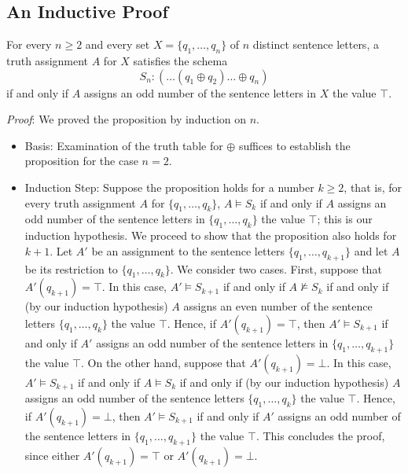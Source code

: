\subsection{An Inductive Proof}
\begin{proposition}\label{parity-prop}
For every $n\geq 2$ and every set $X=\{q_1,\ldots,q_n\}$ of $n$ distinct sentence letters, a truth assignment $A$ for $X$ satisfies the schema
\[S_n: (\ldots(q_1\oplus q_2)\ldots\oplus q_n)\]
if and only if $A$ assigns an odd number of the sentence letters in $X$ the value $\top$.
\end{proposition}
\emph{Proof}: We proved the proposition by induction on $n$. 
\begin{itemize}
\item Basis: Examination of the truth table for $\oplus$ suffices to establish the proposition for the case $n=2$.
\item Induction Step: Suppose the proposition holds for a number $k\geq 2$, that is, 
for every truth assignment $A$ for $\{q_1,\ldots,q_k\}$, $A\models S_k$ if and only if $A$ assigns an odd number of the sentence letters in $\{q_1,\ldots,q_k\}$ the value $\top$; this is our induction hypothesis.
We proceed to show that the proposition also holds for $k+1$. Let $A'$ be an assignment to the sentence letters 
$\{q_1,\ldots,q_{k+1}\}$ and let $A$ be its restriction to $\{q_1,\ldots,q_k\}$. We consider two cases. First, suppose that $A'(q_{k+1}) = \top$. In this case, $A'\models S_{k+1}$ if and only if $A\not\models S_k$ if and only if (by our induction hypothesis) $A$ assigns an even number of the sentence letters $\{q_1,\ldots,q_k\}$ the value $\top$. Hence, if $A'(q_{k+1}) = \top$, then $A'\models S_{k+1}$ if and only if $A'$ assigns an odd number of the sentence letters in $\{q_1,\ldots,q_{k+1}\}$ the value $\top$. On the other hand, suppose that $A'(q_{k+1}) = \bot$. In this case, $A'\models S_{k+1}$ if and only if $A\models S_k$ if and only if (by our induction hypothesis) $A$ assigns an odd number of the sentence letters $\{q_1,\ldots,q_k\}$ the value $\top$. Hence, if $A'(q_{k+1}) = \bot$, then $A'\models S_{k+1}$ if and only if $A'$ assigns an odd number of the sentence letters in $\{q_1,\ldots,q_{k+1}\}$ the value $\top$. This concludes the proof, since either $A'(q_{k+1}) = \top$ or $A'(q_{k+1}) = \bot$. 

\end{itemize}

%
